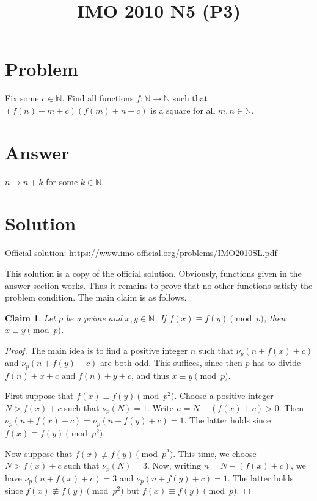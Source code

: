 \documentclass{article}
\title{IMO 2010 N5 (P3)}
\author{}
\date{}
\newcommand{\N}{\mathbb{N}}
\newtheorem*{claim}{Claim}
\begin{document}
\maketitle



\section*{Problem}

Fix some $c \in \N$.
Find all functions $f : \N \to \N$ such that $(f(n) + m + c)(f(m) + n + c)$ is a square for all $m, n \in \N$.



\section*{Answer}

$n \mapsto n + k$ for some $k \in \N$.



\section*{Solution}

Official solution: \url{https://www.imo-official.org/problems/IMO2010SL.pdf}

This solution is a copy of the official solution.
Obviously, functions given in the answer section works.
Thus it remains to prove that no other functions satisfy the problem condition.
The main claim is as follows.

\begin{claim}
Let $p$ be a prime and $x, y \in \N$.
If $f(x) \equiv f(y) \pmod{p}$, then $x \equiv y \pmod{p}$.
\end{claim}
\begin{proof}
The main idea is to find a positive integer $n$ such that $\nu_p(n + f(x) + c)$ and $\nu_p(n + f(y) + c)$ are both odd.
This suffices, since then $p$ has to divide $f(n) + x + c$ and $f(n) + y + c$, and thus $x \equiv y \pmod{p}$.

First suppose that $f(x) \equiv f(y) \pmod{p^2}$.
Choose a positive integer $N > f(x) + c$ such that $\nu_p(N) = 1$.
Write $n = N - (f(x) + c) > 0$.
Then $\nu_p(n + f(x) + c) = \nu_p(n + f(y) + c) = 1$.
The latter holds since $f(x) \equiv f(y) \pmod{p^2}$.

Now suppose that $f(x) \not\equiv f(y) \pmod{p^2}$.
This time, we choose $N > f(x) + c$ such that $\nu_p(N) = 3$.
Now, writing $n = N - (f(x) + c)$, we have $\nu_p(n + f(x) + c) = 3$ and $\nu_p(n + f(y) + c) = 1$.
The latter holds since $f(x) \not\equiv f(y) \pmod{p^2}$ but $f(x) \equiv f(y) \pmod{p}$.
\end{proof}
\end{document}
